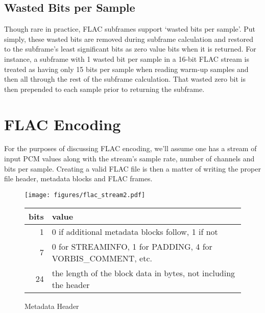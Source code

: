 \subsection{Wasted Bits per Sample}
Though rare in practice, FLAC subframes support `wasted bits per sample'.
Put simply, these wasted bits are removed during subframe calculation
and restored to the subframe's least significant bits as zero value bits
when it is returned.
For instance, a subframe with 1 wasted bit per sample in a 16-bit FLAC
stream is treated as having only 15 bits per sample when reading
warm-up samples and then all through the rest of the subframe
calculation.
That wasted zero bit is then prepended to each sample prior to returning
the subframe.

\section{FLAC Encoding}
For the purposes of discussing FLAC encoding,
we'll assume one has a stream of input PCM values along with the
stream's sample rate, number of channels and bits per sample.
Creating a valid FLAC file is then a matter of writing the proper
file header, metadata blocks and FLAC frames.
\begin{figure}[h]
\texttt{[image: figures/flac\_stream2.pdf]}
\end{figure}

\begin{figure}[h]
\begin{tabular}{|r|l|}
\hline
bits & value \\
\hline
1 & 0 if additional metadata blocks follow, 1 if not \\
7 & 0 for STREAMINFO, 1 for PADDING, 4 for VORBIS\_COMMENT, etc. \\
24 & the length of the block data in bytes, not including the header \\
\hline
\end{tabular}
\caption{Metadata Header}
\end{figure}

